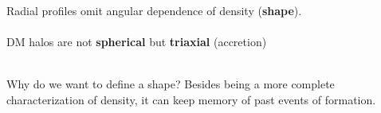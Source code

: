\documentclass[xcolor=dvipsnames]{beamer}
\begin{document}
\begin{frame}
Radial profiles omit angular dependence of density (\textbf{shape}).\\~\\

DM halos are not \textbf{spherical} but \textbf{triaxial} \cite{Allgood2006} (accretion)\\~\\

\begin{block}
{Why do we want to define a shape?}
Besides being a more complete characterization of density, it can keep memory of past events of formation.
\end{block}

\end{frame}
\end{document}
